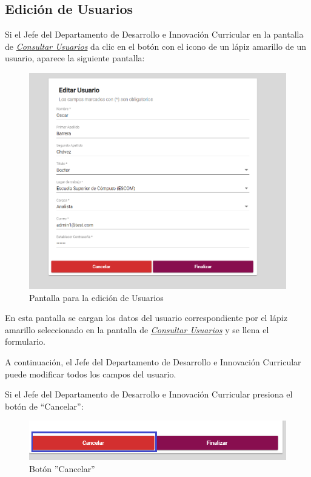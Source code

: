 \newpage

\hypertarget{editar-user-JDDIC}{}
\subsection{Edición de Usuarios}
Si el Jefe del Departamento de Desarrollo e Innovación Curricular en la pantalla de \hyperlink{consultarUs-JDDIC}{\textit{Consultar Usuarios}} da clic en el botón con el icono de un lápiz amarillo de un usuario, aparece la siguiente pantalla:

\begin{figure}[H]
	\centering
	\hypertarget{editarUs-JDDIC}{\includegraphics[width=0.6\linewidth]{images/SP5/Editar-Usuario}}
	\caption{Pantalla para la edición de Usuarios}
	\label{editarrh-JDDIC}
\end{figure}

En esta pantalla se cargan los datos del usuario correspondiente por el lápiz amarillo seleccionado en la pantalla de \hyperlink{consultarUs-JDDIC}{\textit{Consultar Usuarios}} y se llena el formulario.

A continuación, el Jefe del Departamento de Desarrollo e Innovación Curricular puede modificar todos los campos del usuario.

Si el Jefe del Departamento de Desarrollo e Innovación Curricular presiona el botón de “Cancelar”:

\begin{figure}[H]
	\centering
	\hypertarget{cancel2-JDDIC}{\includegraphics[width=0.7\linewidth]{images/SP5/BtnCancelar2}}
	\caption{Botón ''Cancelar''}
	\label{cancel2-JDDIC}
\end{figure}

